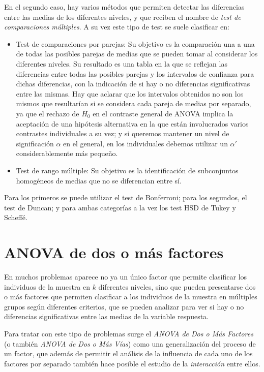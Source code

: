 \documentclass[
  a4paper,
]{scrreport}
\theoremstyle{plain}
\theoremstyle{definition}
\theoremstyle{definition}
\theoremstyle{remark}
\begin{document}
En el segundo caso, hay varios métodos que permiten detectar las
diferencias entre las medias de los diferentes niveles, y que reciben el
nombre de \emph{test de comparaciones múltiples}. A su vez este tipo de
test se suele clasificar en:

\begin{itemize}
\item
  Test de comparaciones por parejas: Su objetivo es la comparación una a
  una de todas las posibles parejas de medias que se pueden tomar al
  considerar los diferentes niveles. Su resultado es una tabla en la que
  se reflejan las diferencias entre todas las posibles parejas y los
  intervalos de confianza para dichas diferencias, con la indicación de
  si hay o no diferencias significativas entre las mismas. Hay que
  aclarar que los intervalos obtenidos no son los mismos que resultarían
  si se considera cada pareja de medias por separado, ya que el rechazo
  de \(H_0\) en el contraste general de ANOVA implica la aceptación de
  una hipótesis alternativa en la que están involucrados varios
  contrastes individuales a su vez; y si queremos mantener un nivel de
  significación \(\alpha\) en el general, en los individuales debemos
  utilizar un \(\alpha'\) considerablemente más pequeño.
\item
  Test de rango múltiple: Su objetivo es la identificación de
  subconjuntos homogéneos de medias que no se diferencian entre sí.
\end{itemize}

Para los primeros se puede utilizar el test de Bonferroni; para los
segundos, el test de Duncan; y para ambas categorías a la vez los test
HSD de Tukey y Scheffé.

\section{ANOVA de dos o más
factores}\label{anova-de-dos-o-muxe1s-factores}

En muchos problemas aparece no ya un único factor que permite clasificar
los individuos de la muestra en \(k\) diferentes niveles, sino que
pueden presentarse dos o más factores que permiten clasificar a los
individuos de la muestra en múltiples grupos según diferentes criterios,
que se pueden analizar para ver si hay o no diferencias significativas
entre las medias de la variable respuesta.

Para tratar con este tipo de problemas surge el \emph{ANOVA de Dos o Más
Factores} (o también \emph{ANOVA de Dos o Más Vías}) como una
generalización del proceso de un factor, que además de permitir el
análisis de la influencia de cada uno de los factores por separado
también hace posible el estudio de la \emph{interacción} entre ellos.
\end{document}
